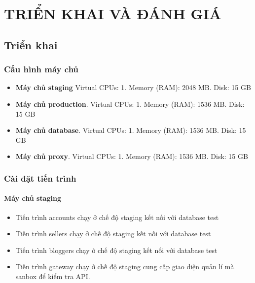 \fontsize{13px}{13px}\selectfont\justifying

\chapter{TRIỂN KHAI VÀ ĐÁNH GIÁ}\label{section:dev}

\section{Triển khai}

\subsection{Cấu hình máy chủ}

\begin{itemize}
	\item \textbf{Máy chủ \gls{staging}} Virtual CPUs: 1. Memory (RAM): 2048 MB. Disk: 15 GB
	
	\item \textbf{Máy chủ \gls{production}}. Virtual CPUs: 1. Memory (RAM): 1536 MB. Disk: 15 GB
	
	\item \textbf{Máy chủ database}. Virtual CPUs: 1. Memory (RAM): 1536 MB. Disk: 15 GB
	
	\item \textbf{Máy chủ proxy}. Virtual CPUs: 1. Memory (RAM): 1536 MB. Disk: 15 GB
\end{itemize}
\subsection{Cài đặt tiến trình}


\subsubsection{Máy chủ \gls{staging}}
\begin{itemize}
	\item Tiến trình accounts chạy ở chế độ \gls{staging} kết nối với database test
	\item Tiến trình sellers chạy ở chế độ \gls{staging} kết nối với database test
	\item Tiến trình bloggers chạy ở chế độ \gls{staging} kết nối với database test
	\item Tiến trình gateway chạy ở chế độ \gls{staging} cung cấp giao diện quản lí mà sanbox để kiểm tra API.
\end{itemize}
